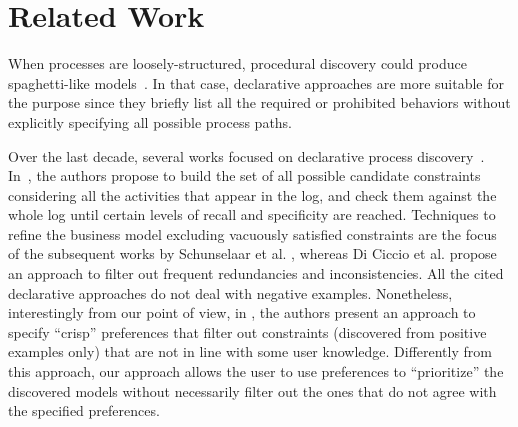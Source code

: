 
\section{Related Work}
\label{sec:related}




When processes are loosely-structured, procedural discovery could produce spaghetti-like models~\cite{2012-Maggi,deviant-tkde}. In that case, declarative approaches are more suitable for the purpose since they briefly list all the required or prohibited behaviors without explicitly specifying all possible process paths. 

Over the last decade, several works focused on declarative process discovery~\cite{2018a-Maggi,DBLP:journals/is/CiccioMM16,2012-Schunselaar,2017-DiCiccio}.
In~\cite{2018a-Maggi,DBLP:journals/is/CiccioMM16}, the authors propose to build the set of all possible candidate \declare constraints considering all the activities that appear in the log, and check them against the whole log until certain levels of recall and specificity are reached. 
Techniques to refine the business model excluding vacuously satisfied constraints are the focus of the subsequent works by Schunselaar et al. \cite{2012-Schunselaar}, whereas Di Ciccio et al. \cite{2017-DiCiccio} propose an approach to filter out frequent redundancies and inconsistencies. 
All the cited declarative approaches do not deal with negative examples. Nonetheless, interestingly from our point of view, in \cite{DBLP:conf/caise/MaggiBA13},  the authors present an approach to specify ``crisp'' preferences that filter out constraints (discovered from positive examples only) that are not in line with some user knowledge. Differently from this approach, our approach allows the user to use preferences to ``prioritize'' the discovered models without necessarily filter out the ones that do not agree with the specified preferences. 


